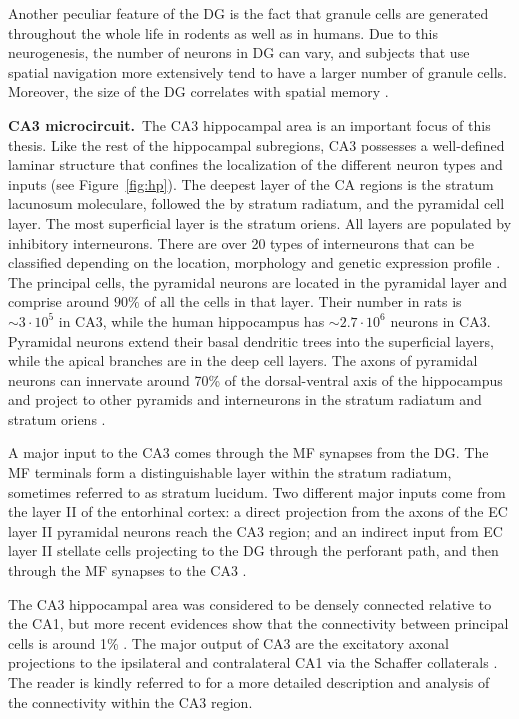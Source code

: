     Another peculiar feature of the DG is the fact that granule cells are
    generated throughout the whole life in rodents as well as in humans. Due to
    this neurogenesis, the number of neurons in DG can vary, and subjects that
    use spatial navigation more extensively tend to have a larger number of
    granule cells. Moreover, the size of the DG correlates with spatial memory
    \citep{Maguire2000, Spalding2013}.

    \textbf{CA3 microcircuit.}\,
    The CA3 hippocampal area is an important focus of this thesis. Like the
    rest of the hippocampal subregions, CA3 possesses a well-defined laminar
    structure that confines the localization of the different neuron types and
    inputs (see Figure~\ref{fig:hp}). The deepest layer of the CA regions is
    the stratum lacunosum moleculare, followed the by stratum radiatum, and the
    pyramidal cell layer. The most superficial layer is the stratum oriens. All
    layers are populated by inhibitory interneurons. There are over 20 types of
    interneurons that can be classified depending on the location, morphology
    and genetic expression profile \citep{Maccaferri2003, Klausberger2008}. The
    principal cells, the pyramidal neurons are located in the pyramidal layer
    and comprise around $90\%$ of all the cells in that layer. Their number in
    rats is $\sim 3 \cdot 10^5$ \citep{Boss1985, Boss1987} in CA3, while the
    human hippocampus has $\sim 2.7 \cdot 10^6$ neurons in CA3.  Pyramidal
    neurons extend their basal dendritic trees into the superficial layers,
    while the apical branches are in the deep cell layers. The axons of
    pyramidal neurons can innervate around 70\% of the dorsal-ventral axis of
    the hippocampus and project to other pyramids and interneurons in the
    stratum radiatum and stratum oriens \citep{Sik1993, Li1994}.

    A major input to the CA3 comes through the MF synapses from the DG. The MF
    terminals form a distinguishable layer within the stratum radiatum,
    sometimes referred to as stratum lucidum. Two different major inputs come
    from the layer II of the entorhinal cortex: a direct projection from the
    axons of the EC layer II pyramidal neurons reach the CA3 region; and an
    indirect input from EC layer II stellate cells projecting to the DG through
    the perforant path, and then through the MF synapses to the CA3
    \citep{Tang2014}. 
    
    The CA3 hippocampal area was considered to be densely connected 
    \cite[$\sim3 \%
    $ in][]{Miles1986} relative to the CA1, but more recent evidences show that
    the connectivity between principal cells is around 1\% \citep{Guzman2016}.
    The major output of CA3 are the excitatory axonal projections to the
    ipsilateral and contralateral CA1 via the Schaffer collaterals
    \citep{Finnerty1993}. The reader is kindly referred to \cite{Duigou2014} for a
    more detailed description and analysis of the connectivity within the
    CA3 region.

